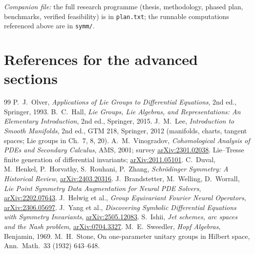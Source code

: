 \documentclass[11pt]{article}
\theoremstyle{definition}
\theoremstyle{remark}
\begin{document}
\bigskip
\noindent\emph{Companion file:} the full research programme (thesis, methodology, phased plan, benchmarks,
verified feasibility) is in \texttt{plan.txt}; the runnable computations referenced above are in
\texttt{symm/}.


\section*{References for the advanced sections}
\begin{thebibliography}{99}
   P.~J.~Olver, \emph{Applications of Lie Groups to Differential Equations}, 2nd ed., Springer, 1993.
   B.~C.~Hall, \emph{Lie Groups, Lie Algebras, and Representations: An Elementary Introduction}, 2nd ed., Springer, 2015.
   J.~M.~Lee, \emph{Introduction to Smooth Manifolds}, 2nd ed., GTM 218, Springer, 2012 (manifolds, charts, tangent spaces; Lie groups in Ch.~7, 8, 20).
   A.~M.~Vinogradov, \emph{Cohomological Analysis of PDEs and Secondary Calculus}, AMS, 2001; survey \href{https://arxiv.org/abs/2301.02038}{arXiv:2301.02038}.
   Lie--Tresse finite generation of differential invariants; \href{https://arxiv.org/abs/2011.05101}{arXiv:2011.05101}.
   C.~Duval, M.~Henkel, P.~Horvathy, S.~Rouhani, P.~Zhang, \emph{Schr\"odinger Symmetry: A Historical Review}, \href{https://arxiv.org/abs/2403.20316}{arXiv:2403.20316}.
   J.~Brandstetter, M.~Welling, D.~Worrall, \emph{Lie Point Symmetry Data Augmentation for Neural PDE Solvers}, \href{https://arxiv.org/abs/2202.07643}{arXiv:2202.07643}.
   J.~Helwig et al., \emph{Group Equivariant Fourier Neural Operators}, \href{https://arxiv.org/abs/2306.05697}{arXiv:2306.05697}.
   J.~Yang et al., \emph{Discovering Symbolic Differential Equations with Symmetry Invariants}, \href{https://arxiv.org/abs/2505.12083}{arXiv:2505.12083}.
   S.~Ishii, \emph{Jet schemes, arc spaces and the Nash problem}, \href{https://arxiv.org/abs/0704.3327}{arXiv:0704.3327}.
   M.~E.~Sweedler, \emph{Hopf Algebras}, Benjamin, 1969.
   M.~H.~Stone, On one-parameter unitary groups in Hilbert space, Ann.\ Math.\ 33 (1932) 643--648.
\end{thebibliography}
\end{document}
